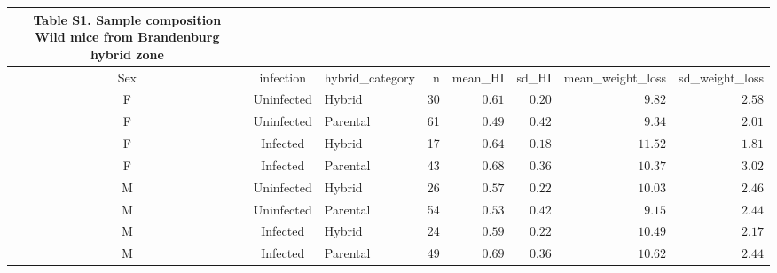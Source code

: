 \begin{longtable}{cclrrrrr}
\caption*{
{\large Table S1. Sample composition} \\ 
{\small Wild mice from Brandenburg hybrid zone}
} \\ 
\toprule
Sex & infection & hybrid\_category & n & mean\_HI & sd\_HI & mean\_weight\_loss & sd\_weight\_loss \\ 
\midrule\addlinespace[2.5pt]
F & Uninfected & Hybrid & 30 & $0.61$ & $0.20$ & $9.82$ & $2.58$ \\ 
F & Uninfected & Parental & 61 & $0.49$ & $0.42$ & $9.34$ & $2.01$ \\ 
F & Infected & Hybrid & 17 & $0.64$ & $0.18$ & $11.52$ & $1.81$ \\ 
F & Infected & Parental & 43 & $0.68$ & $0.36$ & $10.37$ & $3.02$ \\ 
M & Uninfected & Hybrid & 26 & $0.57$ & $0.22$ & $10.03$ & $2.46$ \\ 
M & Uninfected & Parental & 54 & $0.53$ & $0.42$ & $9.15$ & $2.44$ \\ 
M & Infected & Hybrid & 24 & $0.59$ & $0.22$ & $10.49$ & $2.17$ \\ 
M & Infected & Parental & 49 & $0.69$ & $0.36$ & $10.62$ & $2.44$ \\ 
\bottomrule
\end{longtable}

